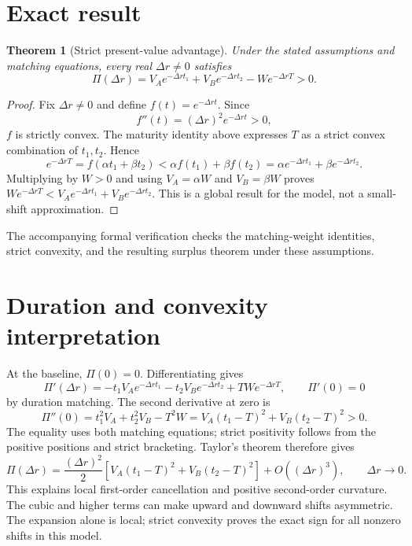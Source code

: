 \documentclass[11pt]{article}
\newtheorem{theorem}{Theorem}
\begin{document}
\section{Exact result}
\begin{theorem}[Strict present-value advantage]
Under the stated assumptions and matching equations, every real \(\Delta r\ne0\) satisfies
\[
 \Pi(\Delta r)=V_Ae^{-\Delta r t_1}+V_Be^{-\Delta r t_2}-We^{-\Delta r T}>0.
\]
\end{theorem}
\begin{proof}
Fix \(\Delta r\ne0\) and define \(f(t)=e^{-\Delta r t}\). Since
\[
 f''(t)=(\Delta r)^2e^{-\Delta r t}>0,
\]
\(f\) is strictly convex. The maturity identity above expresses \(T\) as a strict convex combination of \(t_1,t_2\). Hence
\[
 e^{-\Delta r T}=f(\alpha t_1+\beta t_2)
 <\alpha f(t_1)+\beta f(t_2)
 =\alpha e^{-\Delta r t_1}+\beta e^{-\Delta r t_2}.
\]
Multiplying by \(W>0\) and using \(V_A=\alpha W\) and \(V_B=\beta W\) proves
\(We^{-\Delta r T}<V_Ae^{-\Delta r t_1}+V_Be^{-\Delta r t_2}\).
This is a global result for the model, not a small-shift approximation.
\end{proof}
The accompanying formal verification checks the matching-weight identities, strict convexity, and the resulting surplus theorem under these assumptions.

\section{Duration and convexity interpretation}
At the baseline, \(\Pi(0)=0\). Differentiating gives
\[
 \Pi'(\Delta r)=-t_1V_Ae^{-\Delta r t_1}-t_2V_Be^{-\Delta r t_2}
                 +TWe^{-\Delta r T},
 \qquad \Pi'(0)=0
\]
by duration matching. The second derivative at zero is
\[
 \Pi''(0)=t_1^2V_A+t_2^2V_B-T^2W
         =V_A(t_1-T)^2+V_B(t_2-T)^2>0.
\]
The equality uses both matching equations; strict positivity follows from the positive positions and strict bracketing. Taylor's theorem therefore gives
\[
 \Pi(\Delta r)=\frac{(\Delta r)^2}{2}
 [V_A(t_1-T)^2+V_B(t_2-T)^2]+O((\Delta r)^3),
 \qquad \Delta r\to0.
\]
This explains local first-order cancellation and positive second-order curvature. The cubic and higher terms can make upward and downward shifts asymmetric. The expansion alone is local; strict convexity proves the exact sign for all nonzero shifts in this model.
\end{document}
